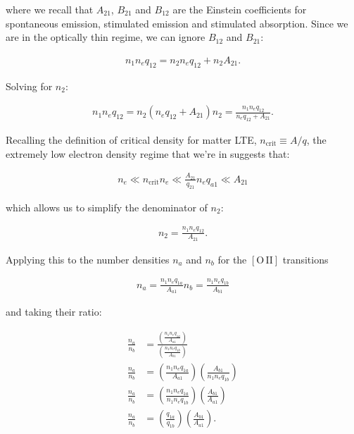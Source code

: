 \documentclass[12pt]{article}
\begin{document}
where we recall that $A_{21}$, $B_{21}$ and $B_{12}$ are the Einstein coefficients for spontaneous emission, stimulated emission and stimulated absorption. Since we are in the optically thin regime, we can ignore $B_{12}$ and $B_{21}$:

\begin{align*}
n_1n_eq_{12} = n_2n_eq_{12} + n_2A_{21}.
\end{align*}

Solving for $n_2$:

\begin{align*}
n_1n_eq_{12} = n_2(n_eq_{12} + A_{21})
n_2 = \frac{n_1n_eq_{12}}{n_eq_{12} + A_{21}}.
\end{align*}

Recalling the definition of critical density for matter LTE, $n_\mathrm{crit} \equiv A/q$, the extremely low electron density regime that we're in suggests that:

\begin{align*}
n_e \ll n_\mathrm{crit}
n_e \ll \frac{A_{21}}{q_{21}}
n_eq_{a1} \ll A_{21}
\end{align*}

which allows us to simplify the denominator of $n_2$:

\begin{align*}
n_2 = \frac{n_1n_eq_{12}}{A_{21}}.
\end{align*}

Applying this to the number densities $n_a$ and $n_b$ for the $\mathrm{[O\,II]}$ transitions

\begin{align*}
n_a = \frac{n_1n_eq_{1a}}{A_{a1}}
n_b = \frac{n_1n_eq_{1b}}{A_{b1}}
\end{align*}

and taking their ratio:

\begin{equation*}
\begin{split}
\frac{n_a}{n_b} &= \frac{\left(\frac{n_1n_eq_{1a}}{A_{a1}}\right)}{\left(\frac{n_1n_eq_{1b}}{A_{b1}}\right)} \\
\frac{n_a}{n_b} &= \left(\frac{n_1n_eq_{1a}}{A_{a1}}\right) \left(\frac{A_{b1}}{n_1n_eq_{1b}}\right) \\
\frac{n_a}{n_b} &= \left(\frac{n_1n_eq_{1a}}{n_1n_eq_{1b}}\right) \left(\frac{A_{b1}}{A_{a1}}\right) \\
\frac{n_a}{n_b} &= \left(\frac{q_{1a}}{q_{1b}}\right) \left(\frac{A_{b1}}{A_{a1}}\right).
\end{split}
\end{equation*}
\end{document}
